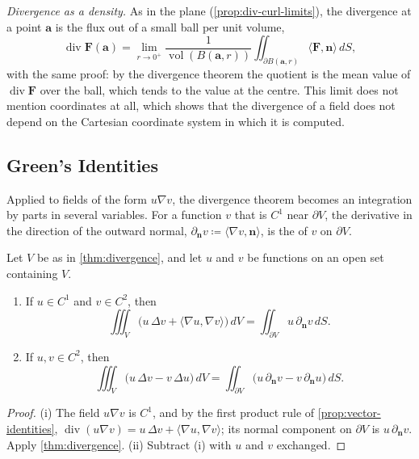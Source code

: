 \emph{Divergence as a density.} As in the plane (\cref{prop:div-curl-limits}), the divergence at a point $\mathbf a$ is the flux out of a small ball per unit volume,
\[
\operatorname{div}\mathbf F(\mathbf a)=\lim_{r\to0^+}\frac1{\operatorname{vol}(B(\mathbf a,r))}\iint_{\partial B(\mathbf a,r)}\langle\mathbf F,\mathbf n\rangle\,dS ,
\]
with the same proof: by the divergence theorem the quotient is the mean value of $\operatorname{div}\mathbf F$ over the ball, which tends to the value at the centre. This limit does not mention coordinates at all, which shows that the divergence of a field does not depend on the Cartesian coordinate system in which it is computed.

\subsection{Green's Identities}

Applied to fields of the form $u\nabla v$, the divergence theorem becomes an integration by parts in several variables. For a function $v$ that is $C^1$ near $\partial V$, the derivative in the direction of the outward normal, $\partial_{\mathbf n}v\coloneqq\langle\nabla v,\mathbf n\rangle$, is the  of $v$ on $\partial V$.

\begin{corollary}
\label{cor:green-identities}
Let $V$ be as in \cref{thm:divergence}, and let $u$ and $v$ be functions on an open set containing $V$.
\begin{enumerate}
\item If $u\in C^1$ and $v\in C^2$, then
\[
\iiint_V\bigl(u\,\Delta v+\langle\nabla u,\nabla v\rangle\bigr)\,dV=\iint_{\partial V}u\,\partial_{\mathbf n}v\,dS .
\]
\item If $u,v\in C^2$, then
\[
\iiint_V\bigl(u\,\Delta v-v\,\Delta u\bigr)\,dV=\iint_{\partial V}\bigl(u\,\partial_{\mathbf n}v-v\,\partial_{\mathbf n}u\bigr)\,dS .
\]
\end{enumerate}
\end{corollary}

\begin{proof}
(i) The field $u\nabla v$ is $C^1$, and by the first product rule of \cref{prop:vector-identities}, $\operatorname{div}(u\nabla v)=u\,\Delta v+\langle\nabla u,\nabla v\rangle$; its normal component on $\partial V$ is $u\,\partial_{\mathbf n}v$. Apply \cref{thm:divergence}. (ii) Subtract (i) with $u$ and $v$ exchanged.
\end{proof}

